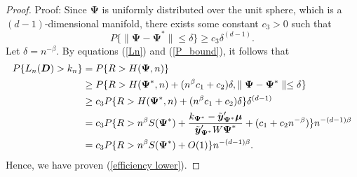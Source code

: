 \documentclass[final,11pt,3p]{article}\usepackage{setspace}
\begin{document}
\begin{proof}{Proof:}
Since $\boldsymbol{\Psi}$ is uniformly distributed over the unit sphere, which is a $(d-1)$-dimensional manifold, there exists some constant $c_3 > 0$ such that
\begin{equation*}
P \{\parallel \boldsymbol{\Psi} - \boldsymbol{\Psi}^* \parallel \le \delta  \} \ge c_3 \delta^{(d-1)}.
\end{equation*}
Let $\delta = n^{-\beta}$. By equations (\ref{Ln}) and (\ref{P_bound}), it follows that
\begin{align}
P\{L_n(\boldsymbol{D}) > k_n\}&=  P\{ R > H(\boldsymbol{\Psi}, n)\} \notag \\
& \ge {P} \{ R > H(\boldsymbol{\Psi}^*, n)+ (n^{\beta}c_1 + c_2) \delta, \parallel \boldsymbol{\Psi} - \boldsymbol{\Psi}^* \parallel \le \delta  \} \notag \\
& \ge c_3 {P} \{ R > H(\boldsymbol{\Psi}^*, n)+ (n^{\beta}c_1 + c_2) \delta\}\delta^{(d-1)} \notag \\
& = c_3 {P} \{ R > n^{\beta} S(\boldsymbol{\Psi}^*)+ \frac{k_{\boldsymbol{\Psi}^*}- \tilde{\boldsymbol{y}}_{\boldsymbol{\Psi}^*}' \boldsymbol{\mu}}{ \tilde{\boldsymbol{y}}_{\boldsymbol{\Psi}^*}' W \boldsymbol{\Psi}^*}+ (c_1 + c_2 n^{-\beta}) \} n^{-(d-1)\beta} \label{inter_step}\\
&=c_3 {P} \{ R > n^{\beta} S(\boldsymbol{\Psi}^*)+ O(1) \} n^{-(d-1)\beta} \notag.
\end{align}
Hence, we have proven (\ref{efficiency lower}).


\end{proof}
\end{document}
